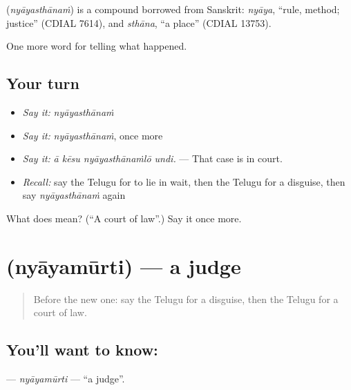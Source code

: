 \begin{cousinweb}
\textbf{} (\emph{nyāyasthānaṁ}) is a compound borrowed from Sanskrit: \emph{nyāya}, \textquotedblleft{}rule, method; justice\textquotedblright{} (CDIAL 7614), and \emph{sthāna}, \textquotedblleft{}a place\textquotedblright{} (CDIAL 13753).
\end{cousinweb}

\begin{grammarlens}[title={What you've built}]
One more word for telling what happened.
\end{grammarlens}

\subsection*{Your turn}
\begin{itemize}
\raggedright
  \item \emph{Say it:} \emph{nyāyasthānaṁ}
  \item \emph{Say it:} \emph{nyāyasthānaṁ}, once more
  \item \emph{Say it:} \emph{ā kēsu nyāyasthānaṁlō undi.} — That case is in court.
  \item \emph{Recall:} say the Telugu for to lie in wait, then the Telugu for a disguise, then say \emph{nyāyasthānaṁ} again
\end{itemize}

\begin{tcolorbox}[breakable,colback=teal!4,colframe=teal!35!black,title={Before you move on}]
What does  mean? (\textquotedblleft{}A court of law\textquotedblright{}.) Say it once more.
\end{tcolorbox}
\section[\texorpdfstring{\te{న్యాయమూర్తి} (nyāyamūrti)}{న్యాయమూర్తి (nyāyamūrti)}]{ (nyāyamūrti) — a judge}

\label{lesson:TE-C349-nyayamurti}



\begin{quote}
Before the new one: say the Telugu for a disguise, then the Telugu for a court of law.
\end{quote}

\subsection*{You'll want to know: }
\textbf{} — \emph{nyāyamūrti} — \textquotedblleft{}a judge\textquotedblright{}.

